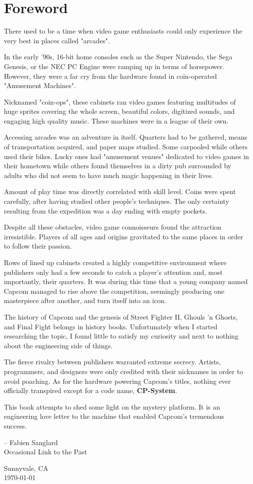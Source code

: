 \chapter*{Foreword}

There used to be a time when video game enthusiasts could only experience the very best in places called "arcades". 

In the early '90s, 16-bit home consoles such as the Super Nintendo, the Sega Genesis, or the NEC PC Engine were ramping up in terms of horsepower. However, they were a far cry from the hardware found in coin-operated "Amusement Machines".

Nicknamed "coin-ops", these cabinets ran video games featuring multitudes of huge sprites covering the whole screen, beautiful colors, digitized sounds, and engaging high quality music. These machines were in a league of their own.

Accessing arcades was an adventure in itself. Quarters had to be gathered, means of transportation acquired, and paper maps studied. Some carpooled while others used their bikes. Lucky ones had "amusement venues" dedicated to video games in their hometown while others found themselves in a dirty pub surrounded by adults who did not seem to have much magic happening in their lives. 

Amount of play time was directly correlated with skill level. Coins were spent carefully, after having studied other people's techniques. The only certainty resulting from the expedition was a day ending with empty pockets. 

Despite all these obstacles, video game connoisseurs found the attraction irresistible. Players of all ages and origins gravitated to the same places in order to follow their passion. 

Rows of lined up cabinets created a highly competitive environment where publishers only had a few seconds to catch a player's attention and, most importantly, their quarters. It was during this time that a young company named Capcom  managed to rise above the competition, seemingly producing one masterpiece after another, and turn itself into an icon.

The history of Capcom and the genesis of Street Fighter II, Ghouls 'n Ghosts, and Final Fight belongs in history books. Unfortunately when I started researching the topic, I found little to satisfy my curiosity and next to nothing about the engineering side of things. 

The fierce rivalry between publishers warranted extreme secrecy. Artists, programmers, and designers were only credited with their nicknames in order to avoid poaching. As for the hardware powering Capcom's titles, nothing ever officially transpired except for a code name, \textbf{CP-System}.

This book attempts to shed some light on the mystery platform. It is an engineering love letter to the machine that enabled Capcom's tremendous success. 

-- Fabien Sanglard\\
Occasional Link to the Past

Sunnyvale, CA\\
\monthyeardate\today\\
